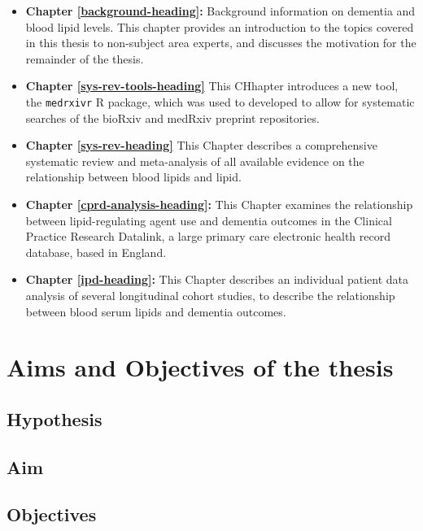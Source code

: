 \documentclass[a4paper, twoside]{templates/ociamthesis}
\providecommand{\tightlist}{%
  \setlength{\itemsep}{0pt}\setlength{\parskip}{0pt}}
\begin{document}
\begin{itemize}
\tightlist
\item
  \textbf{Chapter \ref{background-heading}:} Background information on dementia and blood lipid levels. This chapter provides an introduction to the topics covered in this thesis to non-subject area experts, and discusses the motivation for the remainder of the thesis.
\item
  \textbf{Chapter \ref{sys-rev-tools-heading}} This CHhapter introduces a new tool, the \texttt{medrxivr} R package, which was used to developed to allow for systematic searches of the bioRxiv and medRxiv preprint repositories.
\item
  \textbf{Chapter \ref{sys-rev-heading}} This Chapter describes a comprehensive systematic review and meta-analysis of all available evidence on the relationship between blood lipids and lipid.
\item
  \textbf{Chapter \ref{cprd-analysis-heading}:} This Chapter examines the relationship between lipid-regulating agent use and dementia outcomes in the Clinical Practice Research Datalink, a large primary care electronic health record database, based in England.
\item
  \textbf{Chapter \ref{ipd-heading}:} This Chapter describes an individual patient data analysis of several longitudinal cohort studies, to describe the relationship between blood serum lipids and dementia outcomes.
\end{itemize}

\hypertarget{aims-and-objectives-of-the-thesis}{%
\section{Aims and Objectives of the thesis}\label{aims-and-objectives-of-the-thesis}}

\hypertarget{hypothesis}{%
\subsection{Hypothesis}\label{hypothesis}}

\hypertarget{aim}{%
\subsection{Aim}\label{aim}}

\hypertarget{objectives}{%
\subsection{Objectives}\label{objectives}}
\end{document}

